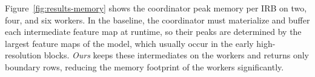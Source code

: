 

Figure~\ref{fig:results-memory} shows the coordinator peak memory per IRB on two, four, and six workers. In the baseline, the coordinator must materialize and buffer each intermediate feature map at runtime, so their peaks are determined by the largest feature maps of the model, which usually occur in the early high-resolution blocks. \emph{Ours} keeps these intermediates on the workers and returns only boundary rows, reducing the memory footprint of the workers significantly. 


